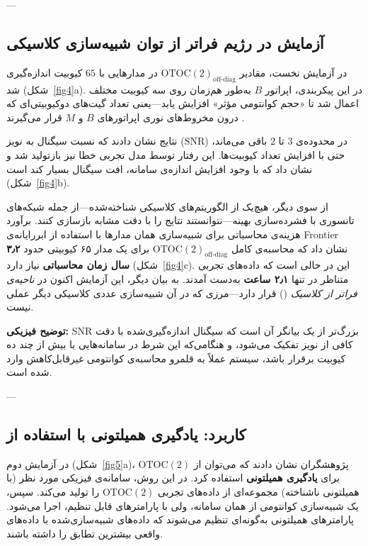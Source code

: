 ---

\subsection{آزمایش در رژیم فراتر از توان شبیه‌سازی کلاسیکی}

در آزمایش نخست، مقادیر \(\mathrm{OTOC(2)}_{\text{off-diag}}\) در مدارهایی با \(65\) کیوبیت اندازه‌گیری شد (شکل~\ref{fig4}a).  
در این پیکربندی، اپراتور \(B\) به‌طور هم‌زمان روی سه کیوبیت مختلف اعمال شد تا «حجم کوانتومی مؤثر» افزایش یابد—یعنی تعداد گیت‌های دوکیوبیتی‌ای که درون مخروط‌های نوری اپراتورهای \(B\) و \(M\) قرار می‌گیرند \cite{Kechedzhi2024}.  

نتایج نشان دادند که نسبت سیگنال به نویز (SNR) در محدوده‌ی \(2 \text{ تا } 3\) باقی می‌ماند، حتی با افزایش تعداد کیوبیت‌ها. این رفتار توسط مدل تجربی خطا نیز بازتولید شد و نشان داد که با وجود افزایش اندازه‌ی سامانه، افت سیگنال بسیار کند است (شکل~\ref{fig4}b).  

از سوی دیگر، هیچ‌یک از الگوریتم‌های کلاسیکی شناخته‌شده—از جمله شبکه‌های تانسوری با فشرده‌سازی بهینه—نتوانستند نتایج را با دقت مشابه بازسازی کنند.  
برآورد هزینه‌ی محاسباتی برای شبیه‌سازی همان مدارها با استفاده از ابررایانه‌ی Frontier نشان داد که محاسبه‌ی کامل \(\mathrm{OTOC(2)}_{\text{off-diag}}\) برای یک مدار ۶۵ کیوبیتی حدود \textbf{۳٫۲ سال زمان محاسباتی} نیاز دارد (شکل~\ref{fig4}c).  
این در حالی است که داده‌های تجربی متناظر در تنها \textbf{۲٫۱ ساعت} به‌دست آمدند.  
به بیان دیگر، این آزمایش اکنون در \textit{ناحیه‌ی فراتر از کلاسیک} () قرار دارد—مرزی که در آن شبیه‌سازی عددی کلاسیکی دیگر عملی نیست.

\textbf{توضیح فیزیکی:}  
SNR بزرگ‌تر از یک بیانگر آن است که سیگنال اندازه‌گیری‌شده با دقت کافی از نویز تفکیک می‌شود، و هنگامی‌که این شرط در سامانه‌هایی با بیش از چند ده کیوبیت برقرار باشد، سیستم عملاً به قلمرو محاسبه‌ی کوانتومی غیرقابل‌کاهش وارد شده است.

---

\subsection{کاربرد: یادگیری همیلتونی با استفاده از }

در آزمایش دوم (شکل~\ref{fig5}a)، پژوهشگران نشان دادند که می‌توان از \(\mathrm{OTOC(2)}\) برای \textbf{یادگیری همیلتونی} استفاده کرد.  
در این روش، سامانه‌ی فیزیکی مورد نظر (با همیلتونی ناشناخته) مجموعه‌ای از داده‌های تجربی \(\mathrm{OTOC(2)}\) را تولید می‌کند.  
سپس، یک شبیه‌سازی کوانتومی از همان سامانه، ولی با پارامترهای قابل تنظیم، اجرا می‌شود.  
پارامترهای همیلتونی به‌گونه‌ای تنظیم می‌شوند که داده‌های شبیه‌سازی‌شده با داده‌های واقعی بیشترین تطابق را داشته باشند.

